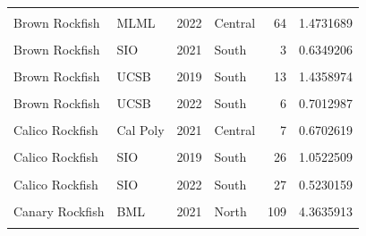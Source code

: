 \documentclass[
]{article}
\begin{document}
\begin{longtable}[t]{llrlrr}
\cellcolor{gray!6}{Brown Rockfish} & \cellcolor{gray!6}{MLML} & \cellcolor{gray!6}{2021} & \cellcolor{gray!6}{Central} & \cellcolor{gray!6}{29} & \cellcolor{gray!6}{1.0903884}\\
Brown Rockfish & MLML & 2022 & Central & 64 & 1.4731689\\
\cellcolor{gray!6}{Brown Rockfish} & \cellcolor{gray!6}{SIO} & \cellcolor{gray!6}{2019} & \cellcolor{gray!6}{South} & \cellcolor{gray!6}{1} & \cellcolor{gray!6}{0.3076923}\\
Brown Rockfish & SIO & 2021 & South & 3 & 0.6349206\\
\addlinespace
\cellcolor{gray!6}{Brown Rockfish} & \cellcolor{gray!6}{SIO} & \cellcolor{gray!6}{2022} & \cellcolor{gray!6}{South} & \cellcolor{gray!6}{6} & \cellcolor{gray!6}{0.4095238}\\
Brown Rockfish & UCSB & 2019 & South & 13 & 1.4358974\\
\cellcolor{gray!6}{Brown Rockfish} & \cellcolor{gray!6}{UCSB} & \cellcolor{gray!6}{2021} & \cellcolor{gray!6}{South} & \cellcolor{gray!6}{1} & \cellcolor{gray!6}{0.4395604}\\
Brown Rockfish & UCSB & 2022 & South & 6 & 0.7012987\\
\cellcolor{gray!6}{Calico Rockfish} & \cellcolor{gray!6}{Cal Poly} & \cellcolor{gray!6}{2019} & \cellcolor{gray!6}{Central} & \cellcolor{gray!6}{1} & \cellcolor{gray!6}{0.3322259}\\
\addlinespace
Calico Rockfish & Cal Poly & 2021 & Central & 7 & 0.6702619\\
\cellcolor{gray!6}{Calico Rockfish} & \cellcolor{gray!6}{Cal Poly} & \cellcolor{gray!6}{2022} & \cellcolor{gray!6}{Central} & \cellcolor{gray!6}{6} & \cellcolor{gray!6}{0.6760562}\\
Calico Rockfish & SIO & 2019 & South & 26 & 1.0522509\\
\cellcolor{gray!6}{Calico Rockfish} & \cellcolor{gray!6}{SIO} & \cellcolor{gray!6}{2021} & \cellcolor{gray!6}{South} & \cellcolor{gray!6}{12} & \cellcolor{gray!6}{0.8075758}\\
Calico Rockfish & SIO & 2022 & South & 27 & 0.5230159\\
\addlinespace
\cellcolor{gray!6}{Canary Rockfish} & \cellcolor{gray!6}{BML} & \cellcolor{gray!6}{2019} & \cellcolor{gray!6}{North} & \cellcolor{gray!6}{57} & \cellcolor{gray!6}{1.5591921}\\
Canary Rockfish & BML & 2021 & North & 109 & 4.3635913\\
\cellcolor{gray!6}{Canary Rockfish} & \cellcolor{gray!6}{BML} & \cellcolor{gray!6}{2022} & \cellcolor{gray!6}{North} & \cellcolor{gray!6}{64} & \cellcolor{gray!6}{1.7360041}\\

\end{longtable}
\end{document}
